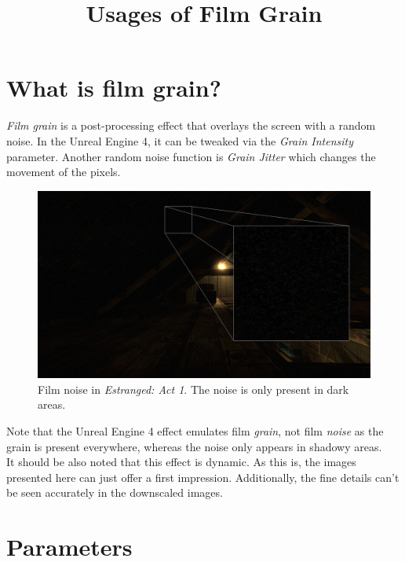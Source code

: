 \documentclass[A4]{article}
\begin{document}
	\title{Usages of Film Grain}
	\date{}
	
	\maketitle
	
	\section*{What is film grain?}
	\textit{Film grain} is a post-processing effect that overlays the screen with a random noise. In the Unreal Engine 4, it can be tweaked via the \textit{Grain Intensity} parameter. Another random noise function is \textit{Grain Jitter} which changes the movement of the pixels.
	\begin{figure}
		\begin{center}
			\vspace{-20px}
			\includegraphics[scale=0.1]{Estranged.png}
			\vspace{-20px}
		\end{center}
		\caption{Film noise in \textit{Estranged: Act 1}. The noise is only present in dark areas.}
		\vspace{-20px}
	\end{figure}
	Note that the Unreal Engine 4 effect emulates film \textit{grain}, not film \textit{noise} as the grain is present everywhere, whereas the noise only appears in shadowy areas.\\
	It should be also noted that this effect is dynamic. As this is, the images presented here can just offer a first impression. Additionally, the fine details can't be seen accurately in the downscaled images.
	
	\section{Parameters}
\end{document}
